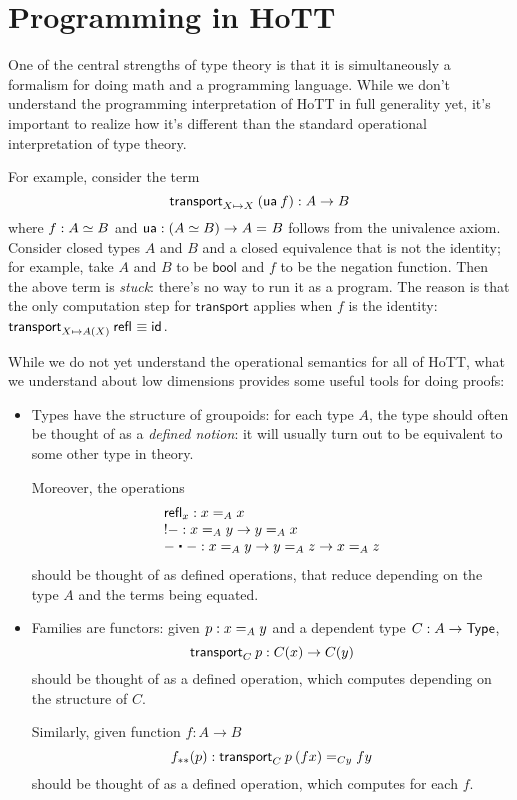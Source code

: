 
\chapter{Programming in HoTT}

One of the central strengths of type theory is that it is simultaneously
a formalism for doing math and a programming language.  While we don't
understand the programming interpretation of HoTT in full generality
yet, it's important to realize how it's different than the standard
operational interpretation of type theory.

\newcommand\ua[1]{\ensuremath{\mathsf{ua}} \: #1}

For example, consider the term 
\[
\transport{X \mapsto X}{(\ua{f})} : A \to B
\]
where $f : \eqv{A}{B}$ and 
$\mathsf{ua} : (\eqv A B) \to \id A B$ follows from the univalence axiom.  
Consider closed types $A$ and $B$ and a closed equivalence that is
not the identity; for example, take $A$ and $B$ to be $\mathsf{bool}$ and
$f$ to be the negation function.  Then the above term is \emph{stuck}:
there's no way to run it as a program.  The reason is that the only
computation step for $\mathsf{transport}$ applies when $f$ is the
identity: $\transport{X \mapsto A(X)}{\refl{}} \jdeq \idfunc$.  

While we do not yet understand the operational semantics for all of
HoTT, what we understand about low dimensions provides some useful tools
for doing proofs:

\begin{itemize}

\item Types have the structure of groupoids: for each type $A$, the
  type  should often be thought of as a \emph{defined notion}: it
  will usually turn out to be equivalent to some other type in theory.  
  
  Moreover, the operations 
  \[
  \begin{array}{l}
    \refl{x} : \id[A]{x}{x} \\
    \opp{-} : \id[A]{x}{y} \to \id[A]{y}{x} \\
    - \ct - : \id[A]{x}{y} \to \id[A]{y}{z} \to \id[A]{x}{z} \\ 
  \end{array}
  \]
  should be thought of as defined operations, that reduce depending on
  the type $A$ and the terms being equated.  

\item Families are functors: given $p : \id[A]{x}{y}$ and a dependent type
  $C : A \to \type$,
  \[
    \transport{C}{p} : C(x) \to C(y)
  \]
  should be thought of as a defined operation, which computes depending
  on the structure of $C$.  

  Similarly, given function $f : A \to B$
  \[
    \mapdep{f}{p} : \id[C y]{\transport{C}{p} \: (f x)}{f y}
  \]
  should be thought of as a defined operation, which computes for each
  $f$.  

\end{itemize}

